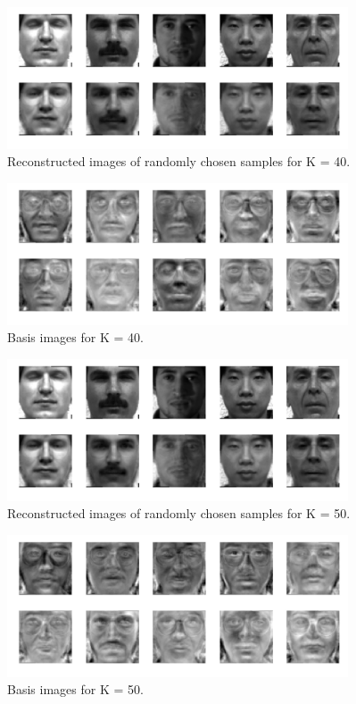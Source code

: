 \documentclass[a4paper,11pt]{article}
\begin{document}
\begin{mlsolution}
\begin{figure}[!htbp]
	\centering
	\includegraphics[width=0.9\textwidth, height=0.4\linewidth]{images/img_k_40.png}
	\caption[k = 40]{Reconstructed images of randomly chosen samples for K = 40.}
\end{figure}
\begin{figure}[!htbp]
	\centering
	\includegraphics[width=0.9\textwidth, height=0.4\linewidth]{images/template_weights_k_40.png}
	\caption[k = 40]{Basis images for K = 40.}
\end{figure}

\begin{figure}[!htbp]
	\centering
	\includegraphics[width=0.9\textwidth, height=0.4\linewidth]{images/img_k_50.png}
	\caption[k = 50]{Reconstructed images of randomly chosen samples for K = 50.}
\end{figure}
\begin{figure}[!htbp]
	\centering
	\includegraphics[width=0.9\textwidth, height=0.4\linewidth]{images/template_weights_k_50.png}
	\caption[k = 50]{Basis images for K = 50.}
\end{figure}


\end{mlsolution}
\end{document}

